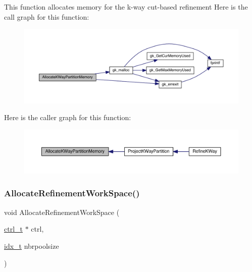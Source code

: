 This function allocates memory for the k-\/way cut-\/based refinement Here is the call graph for this function\+:\nopagebreak
\begin{figure}[H]
\begin{center}
\leavevmode
\includegraphics[width=350pt]{a00945_a22a23a687ef7ed0d4f66ab58e3a81d12_cgraph}
\end{center}
\end{figure}
Here is the caller graph for this function\+:\nopagebreak
\begin{figure}[H]
\begin{center}
\leavevmode
\includegraphics[width=350pt]{a00945_a22a23a687ef7ed0d4f66ab58e3a81d12_icgraph}
\end{center}
\end{figure}
\mbox{\label{a00945_a2b337cc68be55b7e8b6d2218fcea855d}} 
\subsubsection{\texorpdfstring{Allocate\+Refinement\+Work\+Space()}{AllocateRefinementWorkSpace()}}
{\footnotesize\ttfamily void Allocate\+Refinement\+Work\+Space (\begin{DoxyParamCaption}\item[{\hyperlink{a00742}{ctrl\+\_\+t} $\ast$}]{ctrl,  }\item[{\hyperlink{a00876_aaa5262be3e700770163401acb0150f52}{idx\+\_\+t}}]{nbrpoolsize }\end{DoxyParamCaption})}

